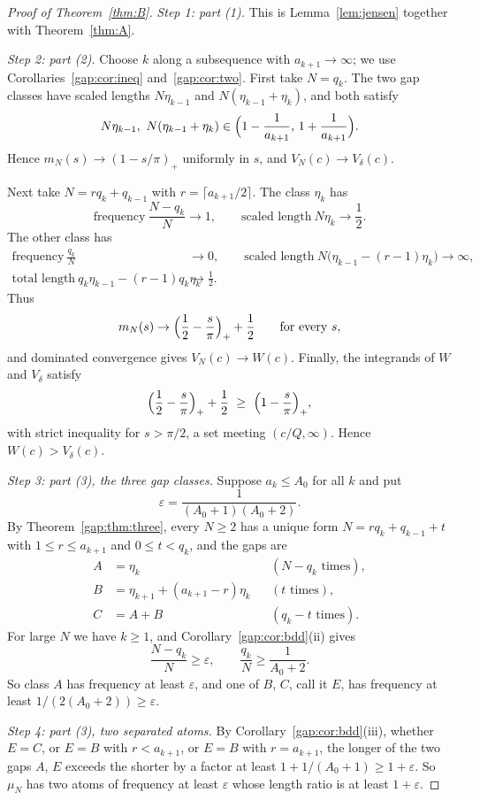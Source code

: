 \documentclass[11pt]{amsart}
\theoremstyle{remark}
\newcommand{\Vd}{V_\delta}
\begin{document}
\begin{proof}[Proof of Theorem~\ref{thm:B}]
\emph{Step 1: part (1).} This is Lemma~\ref{lem:jensen} together with Theorem~\ref{thm:A}.

\emph{Step 2: part (2).} Choose $k$ along a subsequence with $a_{k+1}\to\infty$; we use
Corollaries~\ref{gap:cor:ineq} and~\ref{gap:cor:two}. First take $N=q_k$. The two gap
classes have scaled lengths $N\eta_{k-1}$ and $N(\eta_{k-1}+\eta_k)$, and both satisfy
\[
N\eta_{k-1},\ N(\eta_{k-1}+\eta_k)\in\Bigl(1-\frac1{a_{k+1}},\,1+\frac1{a_{k+1}}\Bigr).
\]
Hence $m_N(s)\to(1-s/\pi)_+$ uniformly in $s$, and $V_N(c)\to\Vd(c)$.

Next take $N=rq_k+q_{k-1}$ with $r=\lceil a_{k+1}/2\rceil$. The class $\eta_k$ has
\[
\text{frequency}\ \frac{N-q_k}{N}\to1,\qquad\text{scaled length}\ N\eta_k\to\frac12 .
\]
The other class has
\begin{align*}
\text{frequency}\ \frac{q_k}{N}&\to0,\qquad
\text{scaled length}\ N\bigl(\eta_{k-1}-(r-1)\eta_k\bigr)\to\infty,\\
\text{total length}\ q_k\eta_{k-1}-(r-1)q_k\eta_k&\to\frac12 .
\end{align*}
Thus
\[
m_N(s)\to\Bigl(\frac12-\frac s\pi\Bigr)_++\frac12\qquad\text{for every }s,
\]
and dominated convergence gives $V_N(c)\to W(c)$. Finally, the integrands of $W$ and $\Vd$ satisfy
\[
\Bigl(\frac12-\frac s\pi\Bigr)_++\frac12\ \ge\ \Bigl(1-\frac s\pi\Bigr)_+ ,
\]
with strict inequality for $s>\pi/2$, a set meeting $(c/Q,\infty)$. Hence $W(c)>\Vd(c)$.

\emph{Step 3: part (3), the three gap classes.} Suppose $a_k\le A_0$ for all $k$ and put
\[
\varepsilon=\frac1{(A_0+1)(A_0+2)} .
\]
By Theorem~\ref{gap:thm:three}, every $N\ge2$ has a unique form $N=rq_k+q_{k-1}+t$ with
$1\le r\le a_{k+1}$ and $0\le t<q_k$, and the gaps are
\begin{align*}
A&=\eta_k && (N-q_k\text{ times}),\\
B&=\eta_{k+1}+(a_{k+1}-r)\eta_k && (t\text{ times}),\\
C&=A+B && (q_k-t\text{ times}).
\end{align*}
For large $N$ we have $k\ge1$, and Corollary~\ref{gap:cor:bdd}(ii) gives
\[
\frac{N-q_k}{N}\ge\varepsilon,\qquad \frac{q_k}{N}\ge\frac1{A_0+2} .
\]
So class $A$ has frequency at least $\varepsilon$, and one of $B$, $C$, call it $E$, has
frequency at least $1/(2(A_0+2))\ge\varepsilon$.

\emph{Step 4: part (3), two separated atoms.} By Corollary~\ref{gap:cor:bdd}(iii), whether
$E=C$, or $E=B$ with $r<a_{k+1}$, or $E=B$ with $r=a_{k+1}$, the longer of the two gaps
$A$, $E$ exceeds the shorter by a factor at least $1+1/(A_0+1)\ge1+\varepsilon$. So $\mu_N$
has two atoms of frequency at least $\varepsilon$ whose length ratio is at least
$1+\varepsilon$.


\end{proof}
\end{document}
